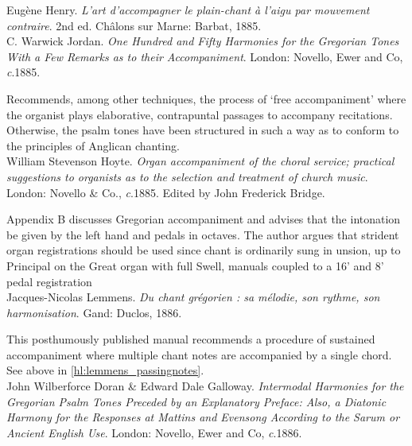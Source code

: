     \parindent=0pt
    \hangindent=0pt
  \covid{}Eugène Henry. \emph{L'art d'accompagner le plain-chant à l'aigu par mouvement contraire}. 2nd ed. Châlons sur Marne:  Barbat, 1885. \\

    \parindent=0pt
    \hangindent=0pt
  C. Warwick Jordan. \emph{One Hundred and Fifty Harmonies for the Gregorian Tones With a Few Remarks as to their Accompaniment}. London:  Novello, Ewer and Co, \emph{c}.1885.

     \parindent=20pt
     \hangindent=20pt
     Recommends, among other techniques, the process of `free accompaniment' where the organist plays elaborative, contrapuntal passages to accompany recitations. Otherwise, the psalm tones have been structured in such a way as to conform to the principles of Anglican chanting.\\

    \parindent=0pt
    \hangindent=0pt
  William Stevenson Hoyte. \emph{Organ accompaniment of the choral service; practical suggestions to organists as to the selection and treatment of church music}. London:  Novello \& Co., \emph{c}.1885. Edited by John Frederick Bridge.

     \parindent=20pt
     \hangindent=20pt
     Appendix B discusses Gregorian accompaniment and advises that the intonation be given by the left hand and pedals in octaves. The  author argues that strident organ registrations should be used since chant is ordinarily sung in unsion, up to Principal on the Great organ with full Swell, manuals coupled to a 16' and 8' pedal registration\\

    \parindent=0pt
    \hangindent=0pt
  Jacques-Nicolas Lemmens. \emph{Du chant grégorien : sa mélodie, son rythme, son harmonisation}. Gand:  Duclos, 1886.

     \parindent=20pt
     \hangindent=20pt
     This posthumously published manual recommends a procedure of sustained accompaniment where multiple chant notes are accompanied by a single chord. See above in \cref{hl:lemmens_passingnotes}.\\

    \parindent=0pt
    \hangindent=0pt
  \covid{}John Wilberforce Doran \& Edward Dale Galloway. \emph{Intermodal Harmonies for the Gregorian Psalm Tones Preceded by an Explanatory Preface: Also, a Diatonic Harmony for the Responses at Mattins and Evensong According to the Sarum or Ancient English Use}. London:  Novello, Ewer and Co, \emph{c}.1886. \\\pagebreak{}


